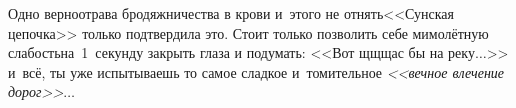{{Одно верно\mdash отрава бродяжничества в крови и~этого не отнять\mdash <<Сунская цепочка>> только подтвердила это. Стоит только позволить себе мимолётную слабость\mdash на~1~секунду закрыть глаза и подумать: <<Вот щ\sdash щ\sdash щас бы на реку$\ldots$>> и~всё, ты уже испытываешь то самое сладкое и~томительное \textit{<<вечное влечение дорог>>}$\ldots$

\begin{center}
\end{center}



}

}